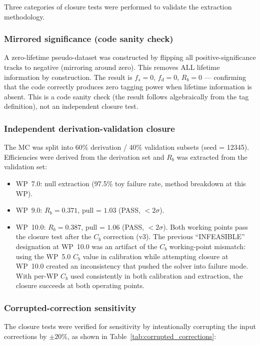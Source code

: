 \documentclass[11pt,a4paper]{article}
\begin{document}
Three categories of closure tests were performed to validate the extraction methodology.

\subsubsection{Mirrored significance (code sanity check)}

A zero-lifetime pseudo-dataset was constructed by flipping all positive-significance
tracks to negative (mirroring around zero). This removes ALL lifetime information by
construction. The result is $f_s = 0$, $f_d = 0$, $R_b = 0$ --- confirming that the
code correctly produces zero tagging power when lifetime information is absent. This is a
code sanity check (the result follows algebraically from the tag definition), not an
independent closure test.

\subsubsection{Independent derivation-validation closure}

The MC was split into 60\% derivation / 40\% validation subsets (seed = 12345).
Efficiencies were derived from the derivation set and $R_b$ was extracted from the
validation set:
\begin{itemize}
\item WP~7.0: null extraction (97.5\% toy failure rate, method breakdown at this WP).
\item WP~9.0: $R_b = 0.371$, pull = $1.03$ (PASS, $< 2\sigma$).
\item WP~10.0: $R_b = 0.387$, pull = $1.06$ (PASS, $< 2\sigma$).
Both working points pass the closure test after the $C_b$ correction (v3).
The previous ``INFEASIBLE'' designation at WP~10.0 was an artifact of the
$C_b$ working-point mismatch: using the WP~5.0 $C_b$ value in calibration
while attempting closure at WP~10.0 created an inconsistency that pushed
the solver into failure mode. With per-WP $C_b$ used consistently in both
calibration and extraction, the closure succeeds at both operating points.
\end{itemize}

\subsubsection{Corrupted-correction sensitivity}

The closure tests were verified for sensitivity by intentionally corrupting the input
corrections by $\pm 20\%$, as shown in Table~\ref{tab:corrupted_corrections}:
\end{document}
